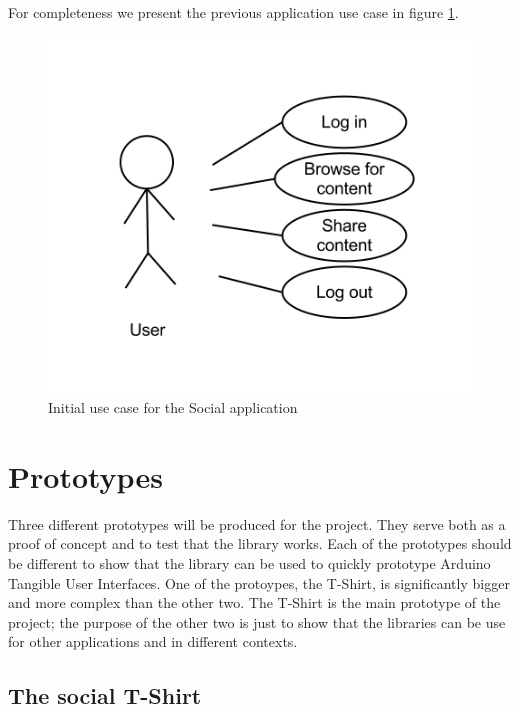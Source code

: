 For completeness we present the previous application use case in figure \ref{fig:design-socialappusecase1}.

\begin{figure}[h!]
\centering \includegraphics[scale=0.35]{img/design-socialappusecase1}
\caption{Initial use case for the Social application}
\label{fig:design-socialappusecase1}
\end{figure}


\newpage
\section{Prototypes}
\label{sec:prototypes}
Three different prototypes will be produced for the project. They serve both as a proof of concept and
to test that the library works. Each of the prototypes should be different to show that the library can be
used to quickly prototype Arduino Tangible User Interfaces. One of the protoypes, the T-Shirt, is significantly
bigger and more complex than the other two. The T-Shirt is the main prototype of the project; the purpose of the other two
is just to show that the libraries can be use for other applications and in different contexts.

\subsection{The social T-Shirt}
	
